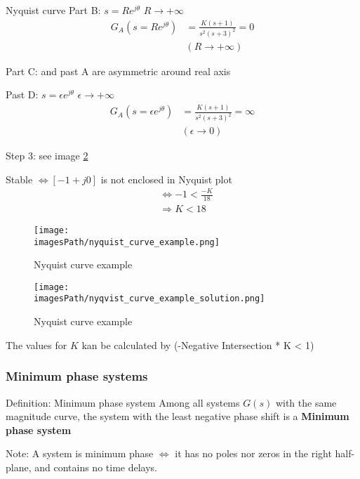 \documentclass{article}
\newcommand{\imagesPath}{images}
\begin{document}
\begin{exampleblock}{Nyquist curve}
    Part B: $s = Re^{j\theta}$ $R\to+\infty$
    \begin{align*}
       G_A(s=Re^{j\theta}) &= \frac{K(s+1)}{s^2(s+3)^2} = 0 \\
        &(R\to+\infty)
    \end{align*}

    Part C: and past A are asymmetric around real axis 

    Past D: $s=\epsilon e^{j\theta}$ $\epsilon\to+\infty$
    \begin{align*}
       G_A(s=\epsilon e^{j\theta}) &= \frac{K(s+1)}{s^2(s+3)^2} = \infty \\
        &(\epsilon\to0)
    \end{align*}

    Step 3: see image \ref{fig:nyquist_curve_example_solution}

    Stable $\Leftrightarrow [-1+j0]$ is not enclosed in Nyquist plot
    \begin{align*}
        &\Leftrightarrow -1 < \frac{-K}{18} \\
        &\Rightarrow K < 18
    \end{align*}
\end{exampleblock}

\begin{figure}[!h]
    \centering
    \texttt{[image: \\imagesPath/nyquist\_curve\_example.png]}
    \caption{Nyquist curve example}
    \label{fig:nyquist_curve_example_parts}
\end{figure}
\begin{figure}[!h]
    \centering
    \texttt{[image: \\imagesPath/nyqvist\_curve\_example\_solution.png]}
    \caption{Nyquist curve example}
    \label{fig:nyquist_curve_example_solution}
\end{figure}

The values for $K$ kan be calculated by (-Negative Intersection * K < 1)


\subsubsection{Minimum phase systems}
\begin{definitionblock}{Definition: Minimum phase system}
   Among all systems $G(s)$ with the same magnitude curve, the system with the 
   least negative phase shift is a \textbf{Minimum phase system} 
\end{definitionblock}
Note: A system is minimum phase $\Leftrightarrow$ it has no poles nor zeros in the 
right half-plane, and contains no time delays.
\end{document}
